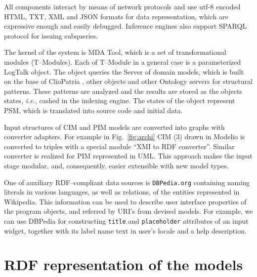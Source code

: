 \documentclass[conference]{IEEEtran}
\begin{document}
All components interact by means of network protocols and use utf-8 encoded HTML, TXT, XML and JSON formats for data representation, which are expressive enough and easily debugged.  Inference engines also support SPARQL protocol for issuing subqueries.

The kernel of the system is MDA Tool, which is a set of transformational modules (T--Modules). Each of T--Module in a general case is a parameterized LogTalk object.  The object queries the Server of domain models, which is built on the base of ClioPatria \cite{Clio}, other objects and other Ontology servers for structural patterns.  These patterns are analyzed and the results are stored as the objects states, \emph{i.e.}, cashed in the indexing engine.  The states of the object represent PSM, which is translated into source code and initial data.

Input structures of CIM and PIM models are converted into graphs with converter adapters.  For example in Fig.~\ref{fig:archi} CIM (3) drawn in Modelio \cite{modelio} is converted to triples with a special module ``XMI to RDF converter''.  Similar converter is realized for PIM represented in UML.  This approach makes the input stage modular, and, consequently, easier extensible with new model types.


One of auxiliary RDF--compliant data sources is \texttt{DBPedia.org} containing naming literals in various languages, as well as relations, of the entities represented in Wikipedia.  This information can be used to describe user interface properties of the program objects, and referred by URI's from devised models.  For example, we can use DBPedia for constructing \texttt{title} and \texttt{placeholder} attributes of an input widget, together with its label name text in user's locale and a help description.


\section{RDF representation of the models}
\label{sec:rdf-repr}
\end{document}
